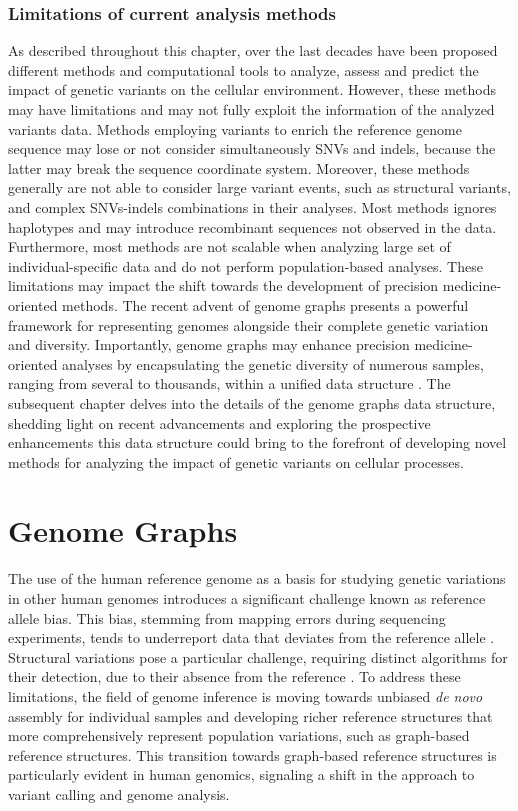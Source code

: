 \documentclass[a4paper, titlepage, openright]{book}
\newcommand{\mychapter}[2]{
    \setcounter{chapter}{#1}
    \setcounter{section}{0}
    \chapter*{#2}
    \addcontentsline{toc}{chapter}{#2}
}
\begin{document}
\subsection{Limitations of current analysis methods}
As described throughout this chapter, over the last decades have been proposed different methods and computational tools to analyze, assess and predict the impact of genetic variants on the cellular environment. However, these methods may have limitations and may not fully exploit the information of the analyzed variants data. Methods employing variants to enrich the reference genome sequence may lose or not consider simultaneously SNVs and indels, because the latter may break the sequence coordinate system. Moreover, these methods generally are not able to consider large variant events, such as structural variants, and complex SNVs-indels combinations in their analyses. Most methods ignores haplotypes and may introduce recombinant sequences not observed in the data. Furthermore, most methods are not scalable when analyzing large set of individual-specific data and do not perform population-based analyses. These limitations may impact the shift towards the development of precision medicine-oriented methods. The recent advent of genome graphs \citep{paten2017genome} presents a powerful framework for representing genomes alongside their complete genetic variation and diversity. Importantly, genome graphs may enhance precision medicine-oriented analyses by encapsulating the genetic diversity of numerous samples, ranging from several to thousands, within a unified data structure \citep{yu2023human}. The subsequent chapter delves into the details of the genome graphs data structure, shedding light on recent advancements and exploring the prospective enhancements this data structure could bring to the forefront of developing novel methods for analyzing the impact of genetic variants on cellular processes.


\mychapter{3}{Genome Graphs}
The use of the human reference genome as a basis for studying genetic variations in other human genomes introduces a significant challenge known as reference allele bias. This bias, stemming from mapping errors during sequencing experiments, tends to underreport data that deviates from the reference allele \citep{degner2009effect, brandt2015mapping}. Structural variations pose a particular challenge, requiring distinct algorithms for their detection, due to their absence from the reference \citep{sudmant2015integrated}. To address these limitations, the field of genome inference is moving towards unbiased \emph{de novo} assembly for individual samples and developing richer reference structures that more comprehensively represent population variations, such as graph-based reference structures. This transition towards graph-based reference structures is particularly evident in human genomics, signaling a shift in the approach to variant calling and genome analysis. 
\end{document}
